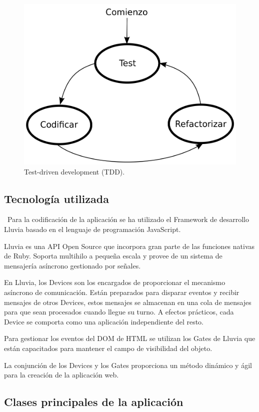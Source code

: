  \begin{figure}[h]
 \centering
 \includegraphics[scale=0.2]{../images/tdd.png}
 \caption{Test-driven development (TDD).}
 \label{fig:../images/tdd.png}
 \end{figure}

\subsection{Tecnología utilizada}
\label{sec:tecnologia_utilizada}
\
Para la codificación de la aplicación se ha utilizado el Framework de desarrollo Lluvia basado en el lenguaje de programación JavaScript. 

Lluvia es una API Open Source que incorpora gran parte de las funciones nativas de Ruby. Soporta multihilo a pequeña escala y provee de un sistema de mensajería asíncrono gestionado por señales. 

En Lluvia, los Devices son los encargados de proporcionar el mecanismo asíncrono de comunicación. Están preparados para disparar eventos y recibir mensajes de otros Devices, estos mensajes se almacenan en una cola de mensajes para que sean procesados cuando llegue su turno. A efectos prácticos, cada Device se comporta como una aplicación independiente del resto.

Para gestionar los eventos del DOM de HTML se utilizan los Gates de Lluvia que están capacitados para mantener el campo de visibilidad del objeto. 

La conjunción de los Devices y los Gates proporciona un método dinámico y ágil para la creación de la aplicación web. 
\subsection{Clases principales de la aplicación}
\label{sec:clases_principlaes}

